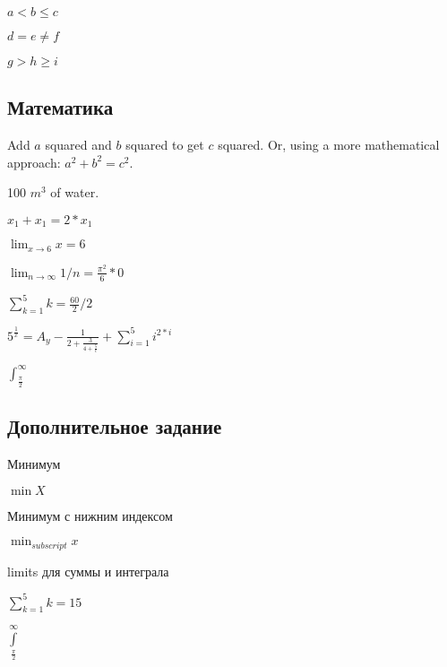 \documentclass[11pt,oneside,a4paper]{article}
\begin{document}
$a < b \le c$

$d = e \ne f$

$g > h \ge i$

\subsection{Математика}

Add $a$ squared and $b$ squared to get $c$ squared.
Or, using a more mathematical approach: $a^2 + b^{2} = c^2$.

100 $m^{3}$ of water.

$x_{1} + x_{1} = 2 * x_{1}$

$\lim_{x \to 6}{x} = 6$

$\lim_{n \to \infty}{1/n} = \frac{\pi^2}{6} * 0$

$\sum_{k=1}^{5}{k} = \frac{60}{2}/2$

${5^{\frac{1}{x}} = A}_{y} - \frac{1}{2 + \frac{3}{4 + \frac{5}{c}}} + \sum_{i=1}^{5}{i^{2*i}}$

$\int_{\frac{\pi}{2}}^{\infty}$

\subsection{Дополнительное задание}

Минимум

$\min X$

Минимум с нижним индексом

$\min_{subscript} x$

limits для суммы и интеграла

$\sum\limits_{k=1}^{5}{k} = 15$

$\int\limits_{\frac{\pi}{2}}^{\infty}$
 
\end{document}
